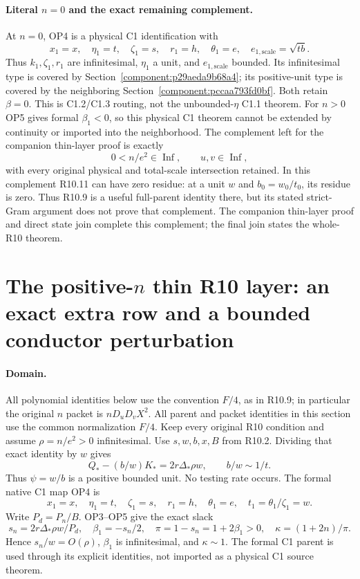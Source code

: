 \paragraph{Literal $n=0$ and the exact remaining complement.}
At $n=0$, OP4 is a physical C1 identification with
\[
 x_1=x,\quad\eta_1=t,\quad\zeta_1=s,\quad r_1=h,
 \quad\theta_1=e,\quad e_{1,\mathrm{scale}}=\sqrt{tb}.
\]
Thus $k_1,\zeta_1,r_1$ are infinitesimal, $\eta_1$ a unit, and
$e_{1,\mathrm{scale}}$ bounded. Its infinitesimal type is covered by
Section~\ref{component:p29aeda9b68a4};
its positive-unit type is covered by the neighboring
Section~\ref{component:pccaa793fd0bf}. Both retain $\beta=0$.
This is C1.2/C1.3 routing, not the unbounded-$\eta$ C1.1 theorem.
For $n>0$ OP5 gives formal $\beta_1<0$, so this physical C1 theorem
cannot be extended by continuity or imported into the neighborhood.
The complement left for the companion thin-layer proof is exactly
\[
       0<n/e^2\in\operatorname{Inf},\qquad u,v\in\operatorname{Inf},
\]
with every original physical and total-scale intersection retained.
In this complement R10.11 can have zero residue: at a unit $w$ and
$b_0=w_0/t_0$, its residue is zero. Thus R10.9 is a useful full-parent
identity there, but its stated strict-Gram argument does not prove that
complement. The companion thin-layer proof and direct state join complete this complement; the final join states the whole-R10 theorem.


\section{\texorpdfstring{The positive-$n$ thin R10 layer: an exact extra row and a bounded conductor perturbation}{The positive-n thin R10 layer: an exact extra row and a bounded conductor perturbation}}
\label{component:pef37475d831e}


\paragraph{Domain.}
All polynomial identities below use the convention $F/4$, as in
R10.9; in particular the original $n$ packet is $nD_uD_vX^2$.
All parent and packet identities in this section use the common normalization $F/4$.
Keep every original R10 condition and assume
$\rho=n/e^2>0$ infinitesimal. Use $s,w,b,x,B$ from R10.2.
Dividing that exact identity by $w$ gives
\[
 Q_*-(b/w)K_*=2r\Delta_*\rho w,
 \qquad b/w\sim1/t.
\tag{TL1}
\]
Thus $\psi=w/b$ is a positive bounded unit. No testing rate occurs.
The formal native C1 map OP4 is
\[
 x_1=x,\quad\eta_1=t,\quad\zeta_1=s,\quad r_1=h,\quad
 \theta_1=e,\quad t_1=\theta_1/\zeta_1=w.
\]
Write $P_d=P_n/B$. OP3--OP5 give the exact slack
\[
 s_n=2r\Delta_*\rho w/P_d,\quad
 \beta_1=-s_n/2,\quad \pi=1-s_n=1+2\beta_1>0,\quad
 \kappa=(1+2n)/\pi.
\tag{TL2}
\]
Hence $s_n/w=O(\rho)$, $\beta_1$ is infinitesimal, and
$\kappa\sim1$. The formal C1 parent is used through its explicit
identities, not imported as a physical C1 source theorem.

